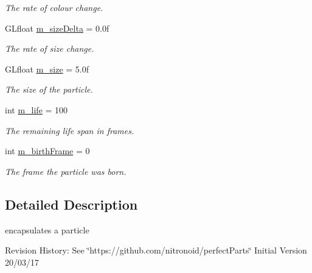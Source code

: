 \begin{DoxyCompactItemize}
\begin{DoxyCompactList}\small\item\em The rate of colour change. \end{DoxyCompactList}\item 
\hypertarget{classParticle_aa823a748fcec2f10bf44143389e4fae9}{G\-Lfloat \hyperlink{classParticle_aa823a748fcec2f10bf44143389e4fae9}{m\-\_\-size\-Delta} = 0.\-0f}\label{classParticle_aa823a748fcec2f10bf44143389e4fae9}

\begin{DoxyCompactList}\small\item\em The rate of size change. \end{DoxyCompactList}\item 
\hypertarget{classParticle_af6e8decb5f201ebabe1f460b0cfbbc8d}{G\-Lfloat \hyperlink{classParticle_af6e8decb5f201ebabe1f460b0cfbbc8d}{m\-\_\-size} = 5.\-0f}\label{classParticle_af6e8decb5f201ebabe1f460b0cfbbc8d}

\begin{DoxyCompactList}\small\item\em The size of the particle. \end{DoxyCompactList}\item 
\hypertarget{classParticle_a281390be9b1a6d0bf3c7506b01cae304}{int \hyperlink{classParticle_a281390be9b1a6d0bf3c7506b01cae304}{m\-\_\-life} = 100}\label{classParticle_a281390be9b1a6d0bf3c7506b01cae304}

\begin{DoxyCompactList}\small\item\em The remaining life span in frames. \end{DoxyCompactList}\item 
\hypertarget{classParticle_a86d093cab863dafaa67891f5fbcca8fc}{int \hyperlink{classParticle_a86d093cab863dafaa67891f5fbcca8fc}{m\-\_\-birth\-Frame} = 0}\label{classParticle_a86d093cab863dafaa67891f5fbcca8fc}

\begin{DoxyCompactList}\small\item\em The frame the particle was born. \end{DoxyCompactList}\end{DoxyCompactItemize}


\subsection{Detailed Description}
encapsulates a particle 

Revision History\-: See \char`\"{}https\-://github.\-com/nitronoid/perfect\-Parts\char`\"{} Initial Version 20/03/17 

